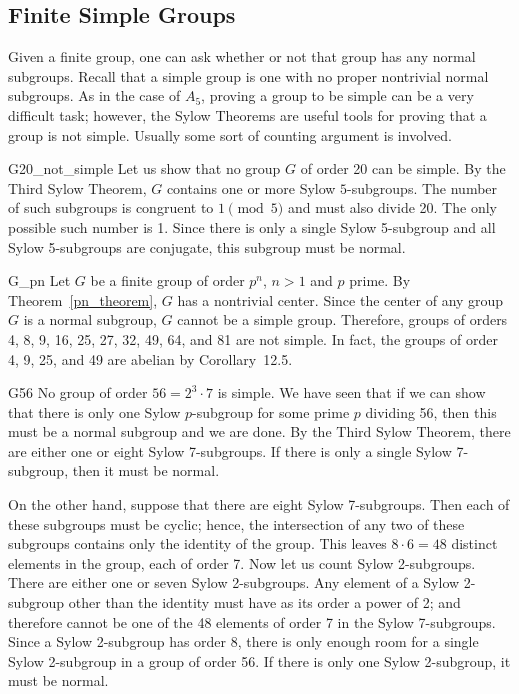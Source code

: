  
 
\subsection*{Finite Simple Groups}
 
 
Given a finite group, one can ask whether or not that group has any
normal subgroups. Recall that a simple group is one with no proper
nontrivial normal subgroups. As in the case of $A_5$, proving a group
to be simple can be a very difficult task; however, the Sylow Theorems
are useful tools for proving that a group is not simple. Usually
some sort of counting argument is involved.
 
 
\begin{example}{G20_not_simple}
Let us show that no group $G$ of order 20 can be simple.  By the Third
Sylow Theorem, $G$ contains one or more Sylow $5$-subgroups. The number
of such subgroups is congruent to $1 \pmod{5}$ and must also divide
20.  The only possible such number is 1.  Since there is only a
single Sylow 5-subgroup and all Sylow 5-subgroups are conjugate, this
subgroup must be normal. 
\end{example}
 
 
 
\begin{example}{G_pn}
Let $G$ be a finite group of order $p^n$, $n>1$ and $p$ prime.  By 
Theorem~\ref{pn_theorem}, $G$ has a nontrivial center. Since the center of any
group $G$ is a normal subgroup, $G$ cannot be a simple group.
Therefore, groups of orders 4, 8, 9, 16, 25, 27, 32, 49, 64, and 81
are not simple.  In fact, the groups of order 4, 9, 25, and 49 are 
abelian by Corollary~12.5.
\end{example}
 
 
 
\begin{example}{G56}
No group of order $56= 2^3 \cdot 7$ is simple.  We have seen that if
we can show that there is only one Sylow $p$-subgroup for some prime
$p$ dividing 56, then this must be a normal subgroup and we are done.
By the Third Sylow Theorem, there are either one or eight Sylow
7-subgroups.  If there is only a single Sylow 7-subgroup, then it must
be normal.  
 
 
On the other hand, suppose that there are eight Sylow 7-subgroups.
Then each of these subgroups must be cyclic; hence, the intersection
of any two of these subgroups contains only the identity of the group.
This leaves $8 \cdot 6 = 48$ distinct elements in the group, each of
order 7. Now let us count Sylow 2-subgroups. There are either one or
seven Sylow 2-subgroups.  Any element of a Sylow 2-subgroup other than
the identity must have as its order a  power of 2; and therefore
cannot be
one of the 48 elements of order 7 in the Sylow 7-subgroups. Since a
Sylow 2-subgroup has order 8, there is only enough room for a single
Sylow 2-subgroup in a group of order 56.  If there is only one Sylow
2-subgroup, it must be normal. 
\end{example}
 
